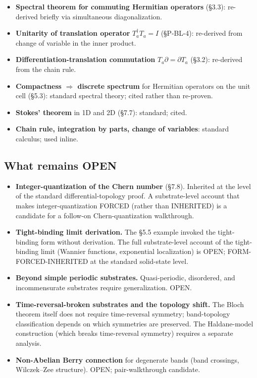 \documentclass[11pt,a4paper]{article}
\begin{document}
\begin{itemize}[noitemsep]
  \item \textbf{Spectral theorem for commuting Hermitian operators} (\S3.3): re-derived briefly via simultaneous diagonalization.
  \item \textbf{Unitarity of translation operator} $T_a^\dagger T_a = I$ (\S P-BL-4): re-derived from change of variable in the inner product.
  \item \textbf{Differentiation-translation commutation} $T_a\partial = \partial T_a$ (\S3.2): re-derived from the chain rule.
  \item \textbf{Compactness $\Rightarrow$ discrete spectrum} for Hermitian operators on the unit cell (\S5.3): standard spectral theory; cited rather than re-proven.
  \item \textbf{Stokes' theorem} in 1D and 2D (\S7.7): standard; cited.
  \item \textbf{Chain rule, integration by parts, change of variables}: standard calculus; used inline.
\end{itemize}

\subsection*{What remains OPEN}

\begin{itemize}[noitemsep]
  \item \textbf{Integer-quantization of the Chern number} (\S7.8). Inherited at the level of the standard differential-topology proof. A substrate-level account that makes integer-quantization FORCED (rather than INHERITED) is a candidate for a follow-on Chern-quantization walkthrough.
  \item \textbf{Tight-binding limit derivation.} The \S5.5 example invoked the tight-binding form without derivation. The full substrate-level account of the tight-binding limit (Wannier functions, exponential localization) is OPEN; FORM-FORCED-INHERITED at the standard solid-state level.
  \item \textbf{Beyond simple periodic substrates.} Quasi-periodic, disordered, and incommensurate substrates require generalization. OPEN.
  \item \textbf{Time-reversal-broken substrates and the topology shift.} The Bloch theorem itself does not require time-reversal symmetry; band-topology classification depends on which symmetries are preserved. The Haldane-model construction (which breaks time-reversal symmetry) requires a separate analysis.
  \item \textbf{Non-Abelian Berry connection} for degenerate bands (band crossings, Wilczek--Zee structure). OPEN; pair-walkthrough candidate.
\end{itemize}
\end{document}
